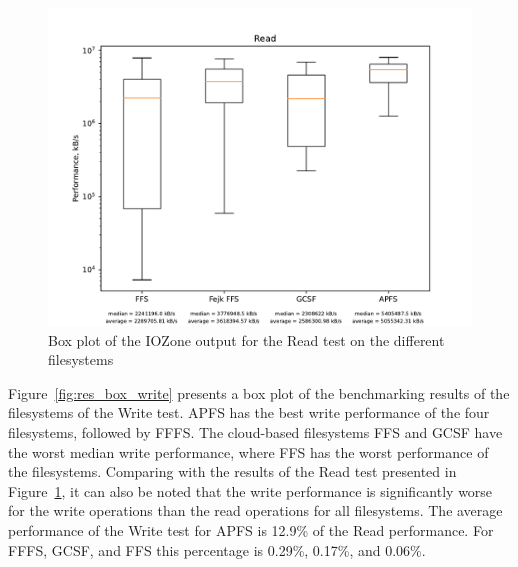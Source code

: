 \begin{figure}[!ht]
	\label{fig:res_box_read}
	\begin{center}
		\includegraphics[width=1.0\textwidth]{figures/benchmarking/Read_box.pdf}
	\end{center}
	\caption{Box plot of the IOZone output for the Read test on the different filesystems}
\end{figure}

\FloatBarrier

Figure~\ref{fig:res_box_write} presents a box plot of the benchmarking results of the filesystems of the Write test. \gls{APFS} has the best write performance of the four filesystems, followed by \gls{FFFS}. The cloud-based filesystems \gls{FFS} and \gls{GCSF} have the worst median write performance, where \gls{FFS} has the worst performance of the filesystems. Comparing with the results of the Read test presented in Figure~\ref{fig:res_box_read}, it can also be noted that the write performance is significantly worse for the write operations than the read operations for all filesystems. The average performance of the Write test for \gls{APFS} is 12.9\% of the Read performance. For \gls{FFFS}, \gls{GCSF}, and \gls{FFS} this percentage is 0.29\%, 0.17\%, and 0.06\%.

